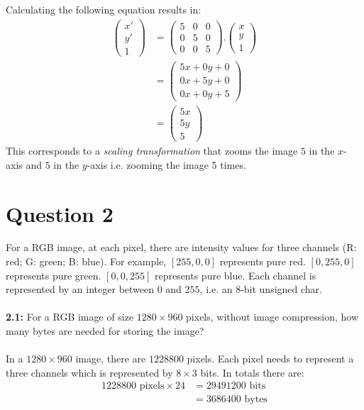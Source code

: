 \documentclass[12pt]{article}
\begin{document}
Calculating the following equation results in:
\begin{align*}
    \begin{pmatrix}
        x' \\
        y' \\
        1 
    \end{pmatrix} &= 
    \begin{pmatrix}
        5 & 0 & 0 \\
        0 & 5 & 0 \\
        0 & 0 & 5
    \end{pmatrix} . 
    \begin{pmatrix}
        x \\
        y \\
        1
    \end{pmatrix} \\ &=
    \left(\begin{matrix}
        5x+0y+0 \\
        0x+5y+0 \\
        0x+0y+5
    \end{matrix}\right) \\ &=
    \left(\begin{matrix}
        5x \\
        5y \\
        5
    \end{matrix}\right)
\end{align*}
This corresponds to a \textit{scaling transformation} that zooms the image
$5$ in the $x$-axis and $5$ in the $y$-axis i.e. zooming the image 5 times.

\section*{Question 2}
For a RGB image, at each pixel, there are intensity values for three channels (R: red; G: green; B:
blue). For example, $[255, 0, 0]$ represents pure red. $[0, 255, 0]$ represents pure green. $[0, 0, 255]$
represents pure blue. Each channel is represented by an integer between $0$ and $255$, i.e. an 8-bit
unsigned char.
\\
\\
\textbf{2.1:} For a RGB image of size $1280 \times 960$ pixels, without image compression, how many bytes are
needed for storing the image?
\\
\\
In a $1280 \times 960$ image, there are $1228800$ pixels. Each pixel needs to represent
a three channels which is represented by $8 \times 3$ bits. In totals there are:
\begin{align*}
    1228800 \text{ pixels} \times 24 &= 29491200 \text{ bits} \\ 
    &= 3686400 \text{ bytes}
\end{align*}
\end{document}
